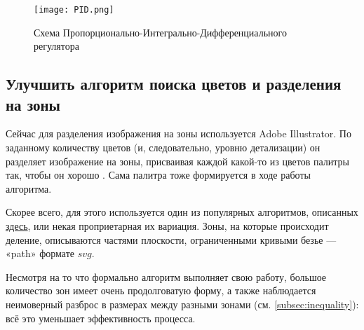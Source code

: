 \begin{figure}[h!]\label{fig:pid}
    \centering
    \texttt{[image: PID.png]}
    \caption{Схема Пропорционально-Интегрально-Дифференциального регулятора}
\end{figure}
\FloatBarrier


\subsection{Улучшить алгоритм поиска цветов и разделения на зоны}\label{subsec:posterisation_and_zoning}

Сейчас для разделения изображения на зоны используется Adobe Illustrator.
По заданному количеству цветов (и, следовательно, уровню детализации) он разделяет изображение на зоны,
присваивая каждой какой-то из цветов палитры так, чтобы он хорошо .
Сама палитра тоже формируется в ходе работы алгоритма.

Скорее всего, для этого используется один из популярных алгоритмов, описанных \href{https://en.wikipedia.org/wiki/Color_quantization}{здесь}, или некая проприетарная их вариация.
Зоны, на которые происходит деление, описываются частями плоскости, ограниченными кривыми безье — «path»  формате $svg$.

Несмотря на то что формально алгоритм выполняет свою работу, большое количество зон имеет очень продолговатую форму,
а также наблюдается неимоверный разброс в размерах между разными зонами (см. \ref{subsec:inequality}):
всё это уменьшает эффективность процесса.


